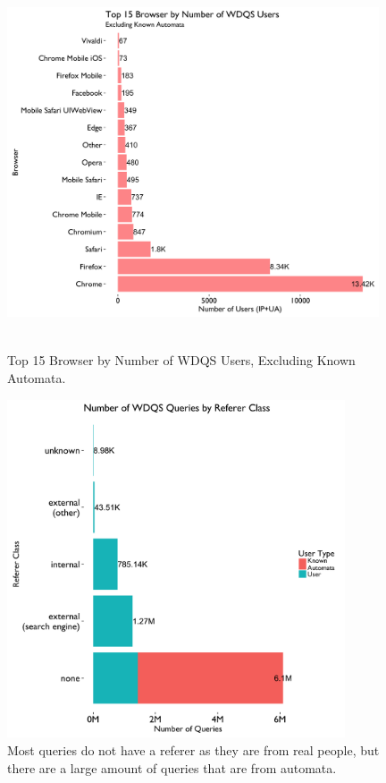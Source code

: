 \documentclass[12pt,]{article}
\begin{document}
\begin{figure}[H]
\centering
\includegraphics[width=11cm,height=11cm,keepaspectratio]{figures/n_user_by_browser.png}
\caption{Top 15 Browser by Number of WDQS Users, Excluding Known
Automata.}
\end{figure}

\begin{figure}[H]
\centering
\includegraphics[width=10cm,height=10cm,keepaspectratio]{figures/n_query_by_referer_class.png}
\caption{Most queries do not have a referer as they are from real
people, but there are a large amount of queries that are from automata.}
\end{figure}
\end{document}
